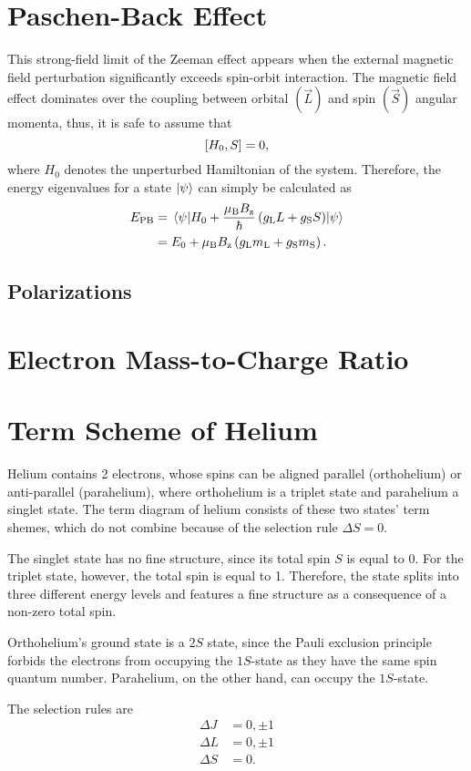 \section{Paschen-Back Effect}
This strong-field limit of the Zeeman effect appears when the external magnetic field perturbation significantly exceeds spin-orbit interaction.
The magnetic field effect dominates over the coupling between orbital $\left(\vec{L}\right)$ and spin $\left(\vec{S}\right)$ angular momenta, thus, it is safe to assume that
\begin{equation*}
	\comm{H_0}{S} = 0,
\end{equation*}
where $H_0$ denotes the unperturbed Hamiltonian of the system.
Therefore, the energy eigenvalues for a state $\ket{\psi}$ can simply be calculated as
\begin{align*}
	E_\text{PB} &= \ev{H_0+\frac{\mu_\text{B}B_\text{z}}{\hbar}\left(g_\text{L}L+g_\text{S}S\right)}{\psi} \\
	&= E_0 + \mu_\text{B}B_\text{z}\left(g_\text{L}m_\text{L}+g_\text{S}m_\text{S}\right).
\end{align*}

\subsection{Polarizations}

\section{Electron Mass-to-Charge Ratio}

\section{Term Scheme of Helium}
Helium contains 2 electrons, whose spins can be aligned parallel (orthohelium) or anti-parallel (parahelium), where orthohelium is a triplet state and parahelium a singlet state.
The term diagram of helium consists of these two states' term shemes, which do not combine because of the selection rule $\Delta S = 0$.

The singlet state has no fine structure, since its total spin $S$ is equal to 0.
For the triplet state, however, the total spin is equal to 1.
Therefore, the state splits into three different energy levels and features a fine structure as a consequence of a non-zero total spin.

Orthohelium's ground state is a $2S$ state, since the Pauli exclusion principle forbids the electrons from occupying the $1S$-state as they have the same spin quantum number.
Parahelium, on the other hand, can occupy the $1S$-state.

The selection rules are
\begin{align*}
	\Delta J &= 0, \pm 1 \\
	\Delta L &= 0, \pm 1 \\
	\Delta S &= 0.
\end{align*}
